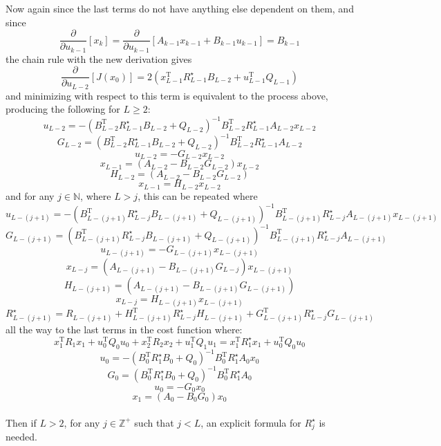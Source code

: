 \documentclass{article}
\begin{document}
Now again since the last terms do not have anything else dependent on them, and since
\[ \frac{\partial}{\partial u_{k-1}} \left[ x_{k} \right] = \frac{\partial}{\partial u_{k-1}} \left[ A_{k-1}x_{k-1} + B_{k-1}u_{k-1} \right] = B_{k-1} \]
the chain rule with the new derivation gives
\[ \frac{\partial}{\partial u_{L-2}} \left[ J(x_{0}) \right] = 2 \left( x_{L-1}^{\text{T}} R^{\star}_{L-1} B_{L-2} + u_{L-1}^{\text{T}}Q_{L-1} \right) \]
and minimizing with respect to this term is equivalent to the process above, producing the following for $L \ge 2$:
\[ \boxed{u_{L-2} = -\left( B_{L-2}^{\text{T}} R^{\star}_{L-1} B_{L-2} + Q_{L-2} \right)^{-1} B_{L-2}^{\text{T}} R^{\star}_{L-1} A_{L-2} x_{L-2}} \]
\[ \boxed{ G_{L-2} = \left( B_{L-2}^{\text{T}} R^{\star}_{L-1} B_{L-2} + Q_{L-2} \right)^{-1} B_{L-2}^{\text{T}} R^{\star}_{L-1} A_{L-2} } \]
\[ \boxed{ u_{L-2} = -G_{L-2} x_{L-2} } \]
\[ x_{L-1} = \left( A_{L-2} - B_{L-2} G_{L-2} \right) x_{L-2} \]
\[ \boxed{ H_{L-2} = \left( A_{L-2} - B_{L-2} G_{L-2} \right) } \]
\[ \boxed{ x_{L-1} = H_{L-2} x_{L-2} } \]
and for any $j\in\mathbb{N}$, where $L > j$, this can be repeated where
\[ \boxed{u_{L-(j+1)} = -\left( B_{L-(j+1)}^{\text{T}} R^{\star}_{L-j} B_{L-(j+1)} + Q_{L-(j+1)} \right)^{-1} B_{L-(j+1)}^{\text{T}} R^{\star}_{L-j} A_{L-(j+1)} x_{L-(j+1)}} \]
\[ \boxed{ G_{L-(j+1)} = \left( B_{L-(j+1)}^{\text{T}} R^{\star}_{L-j} B_{L-(j+1)} + Q_{L-(j+1)} \right)^{-1} B_{L-(j+1)}^{\text{T}} R^{\star}_{L-j} A_{L-(j+1)} } \]
\[ \boxed{ u_{L-(j+1)} = -G_{L-(j+1)} x_{L-(j+1)} } \]
\[ x_{L-j} = \left( A_{L-(j+1)} - B_{L-(j+1)} G_{L-j} \right) x_{L-(j+1)} \]
\[ \boxed{ H_{L-(j+1)} = \left( A_{L-(j+1)} - B_{L-(j+1)} G_{L-(j+1)} \right) } \]
\[ \boxed{ x_{L-j} = H_{L-(j+1)} x_{L-(j+1)} } \]
\[ \boxed{ R^{\star}_{L-(j+1)} = R_{L-(j+1)} + H_{L-(j+1)}^{\text{T}} R^{\star}_{L-j} H_{L-(j+1)} + G_{L-(j+1)}^{\text{T}} R^{\star}_{L-j} G_{L-(j+1)} } \]
all the way to the last terms in the cost function where:
\[ x_{1}^{\text{T}}R_{1}x_{1} + u_{0}^{\text{T}}Q_{0}u_{0} + x_{2}^{\text{T}}R_{2}x_{2} + u_{1}^{\text{T}}Q_{1}u_{1} = x_{1}^{\text{T}} R^{\star}_{1} x_{1} + u_{0}^{\text{T}}Q_{0}u_{0} \]
\[ \boxed{u_{0} = -\left( B_{0}^{\text{T}} R^{\star}_{1} B_{0} + Q_{0} \right)^{-1} B_{0}^{\text{T}} R^{\star}_{1} A_{0} x_{0}} \]
\[ \boxed{ G_{0} = \left( B_{0}^{\text{T}} R^{\star}_{1} B_{0} + Q_{0} \right)^{-1} B_{0}^{\text{T}} R^{\star}_{1} A_{0} } \]
\[ \boxed{ u_{0} = -G_{0} x_{0} } \]
\[ \boxed{ x_{1} = \left( A_{0} - B_{0} G_{0} \right) x_{0} } \]

\paragraph{}
Then if $L>2$, for any $j\in\mathbb{Z}^{+}$ such that $j<L$, an explicit formula for $R^{\star}_{j}$ is needed.
\end{document}

